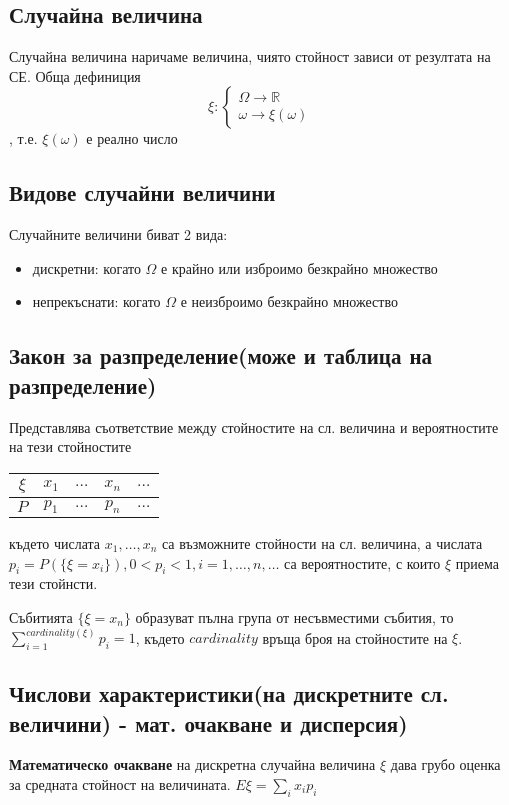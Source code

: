 \documentclass[fleqn,12pt]{article}
\begin{document}
\begin{justify}
\subsection{Случайна величина}
Случайна величина наричаме величина, чиято стойност зависи от резултата на СЕ. Обща дефиниция
\[\xi : \begin{cases}
    \Omega \rightarrow \mathbb{R}\\
    \omega \rightarrow \xi(\omega)
\end{cases} \], т.е. $\xi(\omega)$ е реално число
\subsection{Видове случайни величини}
Случайните величини биват 2 вида:
\begin{itemize}
    \item дискретни: когато $\Omega$ е крайно или изброимо безкрайно множество
    \item непрекъснати: когато $\Omega$ е неизброимо безкрайно множество
\end{itemize}
\subsection{Закон за разпределение(може и таблица на разпределение)}
Представлява съответствие между стойностите на сл. величина и вероятностите на тези стойностите

\begin{tabular}{|c|c|c|c|c|}
    \hline
    $\xi$ & $x_1$ & $\dots$ & $x_n$ & $\dots$ \\
    \hline
    $P$ & $p_1$ & $\dots$ & $p_n$ & $\dots$ \\
    \hline
\end{tabular}

където числата $x_1,\dots,x_n$ са възможните стойности на сл. величина, а числата 
$p_i=P(\{\xi = x_i\}), 0 < p_i < 1, i=1,\dots,n,\dots$ са вероятностите, с които $\xi$ приема тези стойнсти. 

Събитията $\{\xi = x_n\}$ образуват пълна група от несъвместими събития, то $\sum_{i = 1}^{cardinality(\xi)} p_i = 1$, където $cardinality$ връща броя на стойностите на $\xi$.

\subsection{Числови характеристики(на дискретните сл. величини) - мат. очакване и дисперсия)}
\textbf{Математическо очакване} на дискретна случайна величина $\xi$ дава грубо оценка за средната стойност на
величината. $E\xi = \sum_i x_i p_i$


\end{justify}
\end{document}
